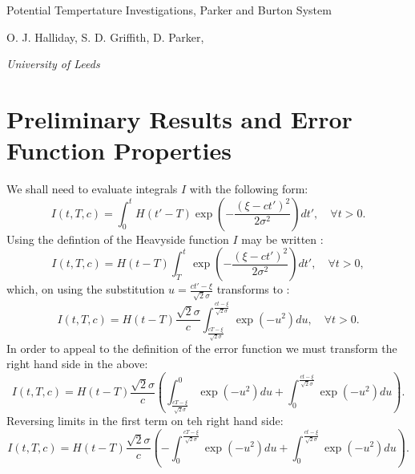 \documentclass[12pt]{article}
\begin{document}
\begin{titlepage}

\vfill \LARGE
\begin{center}
Potential Tempertature Investigations, Parker and Burton System
\large

\rule{0mm}{20mm}

O. J.  Halliday, S. D. Griffith,  D. Parker,

 \vspace{3mm} {\em University of Leeds}





\end{center}

\pagestyle{empty}
\end{titlepage}
%
%
%
\section{Preliminary Results and Error Function Properties}
\label{sec_lemma}
%
We shall need to evaluate integrals $I$ with the following form:
%
\begin{equation}
I (t,T,c)= \int_0^t H(t'-T) \exp \left(- \frac{(\xi - c t')^2 }{ 2 \sigma^2} \right) dt', \quad \forall t>0.
\end{equation}
%
Using the defintion of the Heavyside function $I$ may be written :
%
\begin{equation}
I (t,T,c)= H(t-T) \int_T^t \exp \left(- \frac{(\xi - c t')^2 }{ 2 \sigma^2} \right) dt', \quad \forall t>0,
\end{equation}
%
which, on using the substitution $u = \frac{ct'-\xi}{\sqrt{2} \sigma}$ transforms to :
%
\begin{equation}
I (t,T,c) = H(t-T) \frac{\sqrt{2} \sigma }{ c } \int_{ \frac{cT-\xi}{\sqrt{2} \sigma}}^{ \frac{ct-\xi}{\sqrt{2} \sigma} } \exp \left(- u^2 \right) du, \quad \forall t>0.
\end{equation}
%
In order to appeal to the definition of the error function we must transform the right hand side in the above:
%
\begin{equation}
I (t,T,c) = H(t-T) \frac{\sqrt{2} \sigma }{ c }\left(  \int_{ \frac{cT-\xi}{\sqrt{2} \sigma}}^0 \exp \left(- u^2 \right) du +  \int_0^{ \frac{ct-\xi}{\sqrt{2} \sigma} } \exp \left(- u^2 \right) du \right) .
\end{equation}
%
Reversing limits in the first term on teh right hand side:
%
\begin{equation}
I (t,T,c) = H(t-T) \frac{\sqrt{2} \sigma }{ c }\left(  - \int_0^{ \frac{cT-\xi}{\sqrt{2} \sigma}} \exp \left(- u^2 \right) du +  \int_0^{ \frac{ct-\xi}{\sqrt{2} \sigma} } \exp \left(- u^2 \right) du \right) .
\end{equation}
\end{document}
